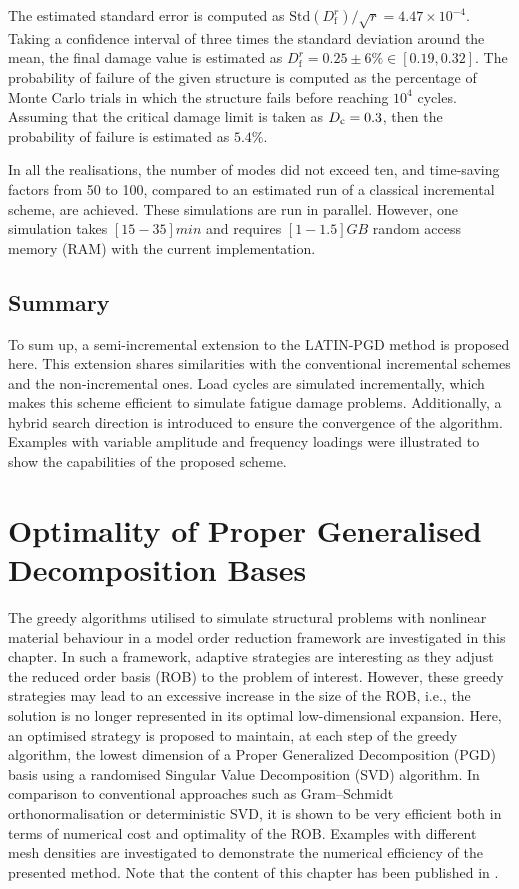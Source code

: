 The estimated standard error is computed as $\text{Std}(D_\mathrm{f}^r)/\sqrt{r} = 4.47 \times 10^{-4}$. Taking a confidence interval of three times the standard deviation around the mean, the final damage value is estimated as $D_{\mathrm{f}}^r=0.25 \pm 6\% \in [0.19,0.32]$. The probability of failure of the given structure is computed as the percentage of Monte Carlo trials in which the structure fails before reaching $10^4$ cycles. Assuming that the critical damage limit is taken as $D_{\rm c}=0.3$, then the probability of failure is estimated as $5.4\%$.

In all the realisations, the number of modes did not exceed ten, and time-saving factors from 50 to 100, compared to an estimated run of a classical incremental scheme, are achieved. These simulations are run in parallel. However, one simulation takes $[15-35]\unit{min}$ and requires $[1-1.5]\unit{GB}$ random access memory (RAM) with the current implementation.

\section{Summary}
To sum up, a semi-incremental extension to the LATIN-PGD method is proposed here. This extension shares similarities with the conventional incremental schemes and the non-incremental ones. Load cycles are simulated incrementally, which makes this scheme efficient to simulate fatigue damage problems. Additionally, a hybrid search direction is introduced to ensure the convergence of the algorithm. Examples with variable amplitude and frequency loadings were illustrated to show the capabilities of the proposed scheme.

\chapter{Optimality of Proper Generalised Decomposition Bases}
\label{optimised_pgd}

The greedy algorithms utilised to simulate structural problems with nonlinear material behaviour in a model order reduction framework are investigated in this chapter. In such a framework, adaptive strategies are interesting as they adjust the reduced order basis (ROB) to the problem of interest. However, these greedy strategies may lead to an excessive increase in the size of the ROB, i.e., the solution is no longer represented in its optimal low-dimensional expansion. Here, an optimised strategy is proposed to maintain, at each step of the greedy algorithm, the lowest dimension of a Proper Generalized Decomposition (PGD) basis using a randomised Singular Value Decomposition (SVD) algorithm. In comparison to conventional approaches such as Gram--Schmidt orthonormalisation or deterministic SVD, it is shown to be very efficient both in terms of numerical cost and optimality of the ROB. Examples with different mesh densities are investigated to demonstrate the numerical efficiency of the presented method. Note that the content of this chapter has been published in \parencite{Alameddin2019d}.

